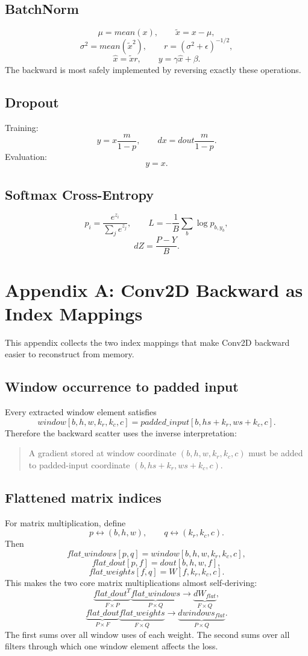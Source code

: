 \documentclass[11pt,a4paper]{article}
\begin{document}
\subsection{BatchNorm}
\[
\mu=mean(x),\qquad
\tilde{x}=x-\mu,
\]
\[
\sigma^2=mean(\tilde{x}^2),\qquad
r=(\sigma^2+\epsilon)^{-1/2},
\]
\[
\hat{x}=\tilde{x}r,
\qquad
y=\gamma\hat{x}+\beta.
\]
The backward is most safely implemented by reversing exactly these operations.

\subsection{Dropout}
Training:
\[
y=x\frac{m}{1-p},
\qquad
dx=dout\frac{m}{1-p}.
\]
Evaluation:
\[
y=x.
\]

\subsection{Softmax Cross-Entropy}
\[
p_i=\frac{e^{z_i}}{\sum_j e^{z_j}},
\qquad
L=-\frac1B\sum_b\log p_{b,y_b},
\]
\[
\boxed{dZ=\frac{P-Y}{B}}.
\]

\newpage
\appendix
\section{Appendix A: Conv2D Backward as Index Mappings}

This appendix collects the two index mappings that make Conv2D backward easier to reconstruct from memory.

\subsection{Window occurrence to padded input}

Every extracted window element satisfies
\[
window[b,h,w,k_r,k_c,c]
=
padded\_input[b,hs+k_r,ws+k_c,c].
\]
Therefore the backward scatter uses the inverse interpretation:
\begin{quote}
A gradient stored at window coordinate $(b,h,w,k_r,k_c,c)$ must be added to padded-input coordinate $(b,hs+k_r,ws+k_c,c)$.
\end{quote}

\subsection{Flattened matrix indices}

For matrix multiplication, define
\[
p\leftrightarrow(b,h,w),
\qquad
q\leftrightarrow(k_r,k_c,c).
\]
Then
\[
flat\_windows[p,q]
=
window[b,h,w,k_r,k_c,c],
\]
\[
flat\_dout[p,f]
=
dout[b,h,w,f],
\]
\[
flat\_weights[f,q]
=
W[f,k_r,k_c,c].
\]
This makes the two core matrix multiplications almost self-deriving:
\[
\underbrace{flat\_dout^T}_{F\times P}
\underbrace{flat\_windows}_{P\times Q}
\rightarrow
\underbrace{dW_{flat}}_{F\times Q},
\]
\[
\underbrace{flat\_dout}_{P\times F}
\underbrace{flat\_weights}_{F\times Q}
\rightarrow
\underbrace{dwindows_{flat}}_{P\times Q}.
\]
The first sums over all window uses of each weight. The second sums over all filters through which one window element affects the loss.
\end{document}
